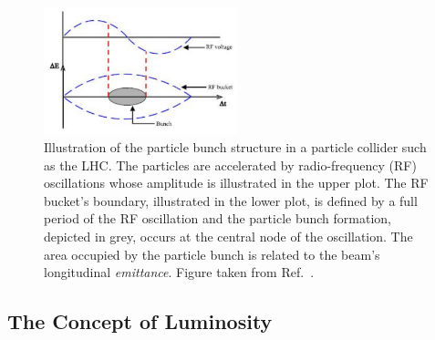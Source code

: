 \begin{figure}[!htb]
    \begin{center}
        \includegraphics[width=0.5\textwidth]{figures/chapter2/lhc_bunch}
        \caption{
            Illustration of the particle bunch structure in a particle collider such as the LHC.
            The particles are accelerated by radio-frequency (RF) oscillations whose
            amplitude is illustrated in the upper plot.
            The RF bucket's boundary, illustrated in the lower plot, is defined by a full period of the RF oscillation
            and the particle bunch formation, depicted in grey, occurs at the central node of the oscillation.
            The area occupied by the particle bunch is related to the beam's longitudinal
            \textit{emittance}.
            Figure taken from Ref.~\cite{Baird:1017689}.
        }
        \label{fig:lhc_bunch}
    \end{center}
\end{figure}

\subsection{The Concept of Luminosity}
\label{sec:lhc_luminosity}

